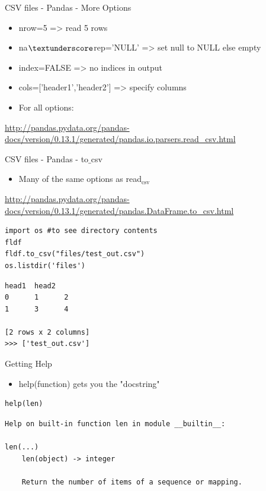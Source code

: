 \documentclass[presentation]{beamer}
\begin{document}
\begin{frame}[label=sec-4-1-24]{CSV files - Pandas - More Options}
\begin{itemize}
\item nrow=5 => read 5 rows
\item na\(\textunderscore\)rep='NULL' => set null to NULL else empty
\item index=FALSE => no indices in output
\item cols=['header1','header2'] => specify columns
\item For all options:
\end{itemize}
\url{http://pandas.pydata.org/pandas-docs/version/0.13.1/generated/pandas.io.parsers.read_csv.html}
\end{frame}

\begin{frame}[fragile,label=sec-4-1-25]{CSV files - Pandas - to\(\_\)csv}
 \begin{itemize}
\item Many of the same options as read$_{\text{csv}}$
\end{itemize}
\url{http://pandas.pydata.org/pandas-docs/version/0.13.1/generated/pandas.DataFrame.to_csv.html}
\lstset{numbers=left,language=Python,label= ,caption= }
\begin{lstlisting}
import os #to see directory contents
fldf
fldf.to_csv("files/test_out.csv")
os.listdir('files')
\end{lstlisting}

\lstset{numbers=left,language=Python,label= ,caption= }
\begin{lstlisting}
head1  head2
0      1      2
1      3      4

[2 rows x 2 columns]
>>> ['test_out.csv']
\end{lstlisting}
\end{frame}


\begin{frame}[fragile,label=sec-4-1-26]{Getting Help}
 \begin{itemize}
\item help(function) gets you the "docstring"
\end{itemize}
\lstset{numbers=left,language=Python,label= ,caption= }
\begin{lstlisting}
help(len)
\end{lstlisting}

\lstset{numbers=left,language=Python,label= ,caption= }
\begin{lstlisting}
Help on built-in function len in module __builtin__:

len(...)
    len(object) -> integer

    Return the number of items of a sequence or mapping.
\end{lstlisting}
\end{frame}
\end{document}
